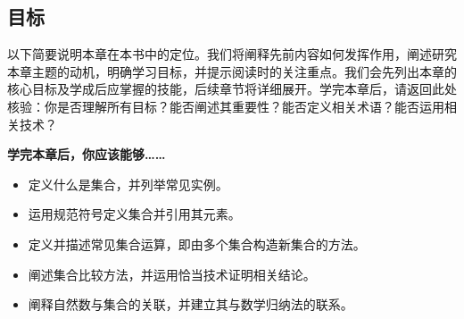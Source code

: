 \subsection{目标}

以下简要说明本章在本书中的定位。我们将阐释先前内容如何发挥作用，阐述研究本章主题的动机，明确学习目标，并提示阅读时的关注重点。我们会先列出本章的核心目标及学成后应掌握的技能，后续章节将详细展开。学完本章后，请返回此处核验：你是否理解所有目标？能否阐述其重要性？能否定义相关术语？能否运用相关技术？

\textbf{学完本章后，你应该能够……}

\begin{itemize}
    \item 定义什么是集合，并列举常见实例。
    \item 运用规范符号定义集合并引用其元素。
    \item 定义并描述常见集合运算，即由多个集合构造新集合的方法。
    \item 阐述集合比较方法，并运用恰当技术证明相关结论。
    \item 阐释自然数与集合的关联，并建立其与数学归纳法的联系。
\end{itemize}
